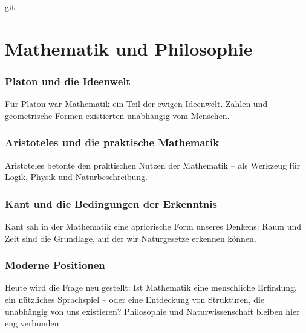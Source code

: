 git\chapter{Mathematik und Philosophie}
\label{chap:VII_philosophie}
\label{chap:VII_anwendungen}
\setcounter{section}{7}
\setcounter{subsection}{0}
\setcounter{subsubsection}{1}
\setcounter{secnumdepth}{3}







\subsection{Platon und die Ideenwelt}
Für Platon war Mathematik ein Teil der ewigen Ideenwelt. 
Zahlen und geometrische Formen existierten unabhängig vom Menschen. 

\subsection{Aristoteles und die praktische Mathematik}
Aristoteles betonte den praktischen Nutzen der Mathematik – 
als Werkzeug für Logik, Physik und Naturbeschreibung. 

\subsection{Kant und die Bedingungen der Erkenntnis}
Kant sah in der Mathematik eine apriorische Form unseres Denkens: 
Raum und Zeit sind die Grundlage, auf der wir Naturgesetze erkennen können. 

\subsection{Moderne Positionen}
Heute wird die Frage neu gestellt: 
Ist Mathematik eine menschliche Erfindung, ein nützliches Sprachspiel – 
oder eine Entdeckung von Strukturen, die unabhängig von uns existieren? 
Philosophie und Naturwissenschaft bleiben hier eng verbunden. 
